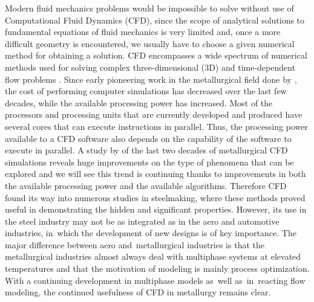 Modern fluid mechanics problems would be impossible to solve without use of Computational Fluid Dynamics (CFD), since the scope of analytical solutions to fundamental equations of fluid mechanics is very limited and, once a more difficult geometry is encountered, we usually have to choose a given numerical method
for obtaining a solution. CFD encompasses a wide spectrum of numerical methods used for solving complex three-dimensional (3D) and time-dependent flow problems \citep{RAPP20173}. Since early pioneering work in the metallurgical field done by \citet{Szekely1977}, the cost of performing computer simulations has decreased over the last few decades, while the available processing power has increased. Most of the processors and  processing units that are currently developed and produced have several cores that can execute instructions in parallel. Thus, the processing power available to a CFD software also depends on the capability of the software to execute in parallel. A study by \citet{Ersson2018} of the last two decades of metallurgical CFD simulations reveals huge improvements on the type of phenomena that can be explored and we will see this trend is continuing thanks to improvements in both the available processing power and the available algorithms. Therefore CFD found its way into numerous studies in steelmaking, where these methods proved useful in demonstrating the hidden and significant properties. However, its use in the steel industry may not be as integrated as in the aero and automotive industries, in~which the development of new designs is of key importance. The major difference between aero and~metallurgical industries is that the metallurgical industries almost always deal with multiphase systems at elevated temperatures and that the motivation of modeling is mainly process optimization. With a continuing development in multiphase models as~well as~in~reacting flow modeling, the continued usefulness of CFD in metallurgy remains clear.

